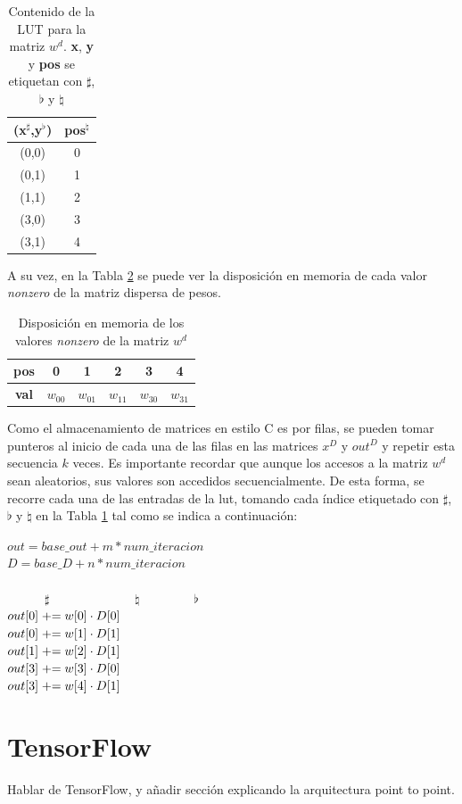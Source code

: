 \begin{table}[h!]
    \centering
    \begin{tabular}{|c|c|}
    \hline
    \textbf{(x$^{\sharp}$,y$^{\flat}$)} & \textbf{pos$^{\natural}$} \\\hline
    (0,0) & 0 \\\hline
    (0,1) & 1 \\\hline
    (1,1) & 2 \\\hline
    (3,0) & 3 \\\hline
    (3,1) & 4 \\\hline
    \end{tabular}
    \caption{Contenido de la LUT para la matriz $w^{d}$. \textbf{x}, \textbf{y} y \textbf{pos} se etiquetan con $\sharp$, {\large$\flat$} y $\natural$}
    \label{tab:lut_example}
\end{table}

A su vez, en la Tabla \ref{tab:w_matrix_memory_layout} se puede ver la disposición en memoria de cada valor \textit{nonzero} de la matriz dispersa de pesos.

\begin{table}[h!]
    \centering
    \begin{tabular}{|c|c|c|c|c|c|}
        \hline
        \textbf{pos} & 0 & 1 & 2 & 3 & 4 \\\hline
        \textbf{val} & $w_{00}$ & $w_{01}$ & $w_{11}$ & $w_{30}$ & $w_{31}$ \\\hline
    \end{tabular}
    \caption{Disposición en memoria de los valores \textit{nonzero} de la matriz $w^{d}$}
    \label{tab:w_matrix_memory_layout}
\end{table}

Como el almacenamiento de matrices en estilo C es por filas, se pueden tomar punteros al inicio de cada una de las filas en las matrices $x^{D}$ y $out^{D}$ y repetir esta secuencia $k$ veces. Es importante recordar que aunque los accesos a la matriz $w^{d}$ sean aleatorios, sus valores son accedidos secuencialmente. De esta forma, se recorre cada una de las entradas de la \acrshort{lut}, tomando cada índice etiquetado con $\sharp$, $\flat$ y $\natural$ en la Tabla \ref{tab:lut_example} tal como se indica a continuación:

\begin{center}
    $out = base\_out + m*num\_iteracion$\\
    $D = base\_D + n*num\_iteracion$\\
    \ \\
    \ \ \ \ \ \  $\sharp$ \ \ \ \ \ \ \ \ \ \ \ \ \  $\natural$ \ \ \ \ \ \ \ \  {\large$\flat$} \ \\
    $out[0] \mathrel{+}= w[0] \cdot D[0]$\\
    $out[0] \mathrel{+}= w[1] \cdot D[1]$\\
    $out[1] \mathrel{+}= w[2] \cdot D[1]$\\
    $out[3] \mathrel{+}= w[3] \cdot D[0]$\\
    $out[3] \mathrel{+}= w[4] \cdot D[1]$\\
\end{center}

\section{TensorFlow}
\label{sec:tensorflow}
Hablar de TensorFlow, y añadir sección explicando la arquitectura point to point.
